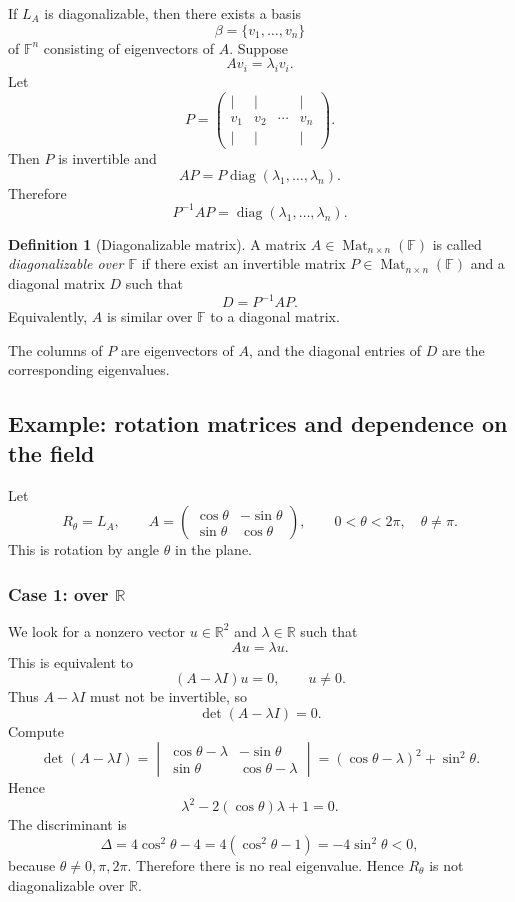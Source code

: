 \documentclass[11pt]{article}
\newcommand{\F}{\mathbb F}
\newcommand{\R}{\mathbb R}
\newcommand{\Mat}{\operatorname{Mat}}
\newcommand{\diag}{\operatorname{diag}}
\theoremstyle{definition}
\newtheorem{definition}{Definition}[section]
\theoremstyle{plain}
\begin{document}
If $L_A$ is diagonalizable, then there exists a basis
\[
\beta=\{v_1,\dots,v_n\}
\]
of $\F^n$ consisting of eigenvectors of $A$.  Suppose
\[
Av_i=\lambda_i v_i.
\]
Let
\[
P=\begin{pmatrix} |&|&&|\\ v_1&v_2&\cdots&v_n\\ |&|&&|\end{pmatrix}.
\]
Then $P$ is invertible and
\[
AP=P\diag(\lambda_1,\dots,\lambda_n).
\]
Therefore
\[
P^{-1}AP=\diag(\lambda_1,\dots,\lambda_n).
\]

\begin{definition}[Diagonalizable matrix]
A matrix $A\in\Mat_{n\times n}(\F)$ is called \emph{diagonalizable over $\F$} if there exist an invertible matrix $P\in\Mat_{n\times n}(\F)$ and a diagonal matrix $D$ such that
\[
D=P^{-1}AP.
\]
Equivalently, $A$ is similar over $\F$ to a diagonal matrix.
\end{definition}

The columns of $P$ are eigenvectors of $A$, and the diagonal entries of $D$ are the corresponding eigenvalues.

\subsection{Example: rotation matrices and dependence on the field}

Let
\[
R_\theta=L_A,
\qquad
A=\begin{pmatrix}
\cos\theta&-\sin\theta\\
\sin\theta&\cos\theta
\end{pmatrix},
\qquad
0<\theta<2\pi,
\quad
\theta\neq\pi.
\]
This is rotation by angle $\theta$ in the plane.

\subsubsection*{Case 1: over $\R$}

We look for a nonzero vector $u\in\R^2$ and $\lambda\in\R$ such that
\[
Au=\lambda u.
\]
This is equivalent to
\[
(A-\lambda I)u=0,
\qquad u\neq 0.
\]
Thus $A-\lambda I$ must not be invertible, so
\[
\det(A-\lambda I)=0.
\]
Compute
\[
\det(A-\lambda I)
=\begin{vmatrix}
\cos\theta-\lambda&-\sin\theta\\
\sin\theta&\cos\theta-\lambda
\end{vmatrix}
=(\cos\theta-\lambda)^2+\sin^2\theta.
\]
Hence
\[
\lambda^2-2(\cos\theta)\lambda+1=0.
\]
The discriminant is
\[
\Delta=4\cos^2\theta-4=4(\cos^2\theta-1)=-4\sin^2\theta<0,
\]
because $\theta\neq 0,\pi,2\pi$.  Therefore there is no real eigenvalue.  Hence $R_\theta$ is not diagonalizable over $\R$.
\end{document}
